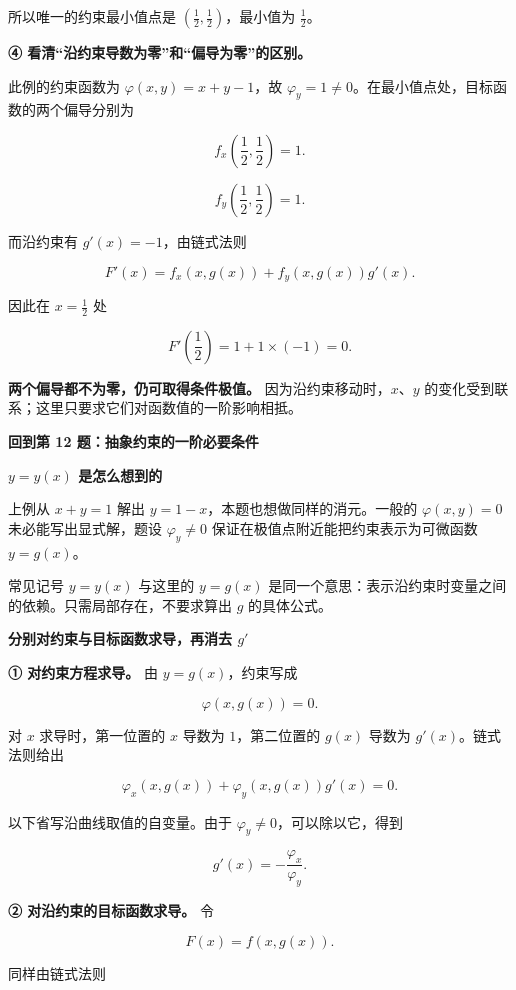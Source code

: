 \documentclass[UTF8,11pt,fontset=windows]{ctexart}
\begin{document}
所以唯一的约束最小值点是 $(\frac12,\frac12)$，最小值为 $\frac12$。

\textbf{④ 看清“沿约束导数为零”和“偏导为零”的区别。}

此例的约束函数为 $\varphi(x,y)=x+y-1$，故 $\varphi_y=1\ne0$。在最小值点处，目标函数的两个偏导分别为

$$
f_x\left(\frac12,\frac12\right)=1.
$$

$$
f_y\left(\frac12,\frac12\right)=1.
$$

而沿约束有 $g'(x)=-1$，由链式法则

$$
F'(x)=f_x(x,g(x))+f_y(x,g(x))g'(x).
$$

因此在 $x=\frac12$ 处

$$
F'\left(\frac12\right)=1+1\times(-1)=0.
$$

\textbf{两个偏导都不为零，仍可取得条件极值。} 因为沿约束移动时，$x$、$y$ 的变化受到联系；这里只要求它们对函数值的一阶影响相抵。

{\bfseries 回到第 12 题：抽象约束的一阶必要条件\par}

{\bfseries $y=y(x)$ 是怎么想到的\par}
上例从 $x+y=1$ 解出 $y=1-x$，本题也想做同样的消元。一般的 $\varphi(x,y)=0$ 未必能写出显式解，题设 $\varphi_y\ne0$ 保证在极值点附近能把约束表示为可微函数 $y=g(x)$。

常见记号 $y=y(x)$ 与这里的 $y=g(x)$ 是同一个意思：表示沿约束时变量之间的依赖。只需局部存在，不要求算出 $g$ 的具体公式。

{\bfseries 分别对约束与目标函数求导，再消去 $g'$\par}
\textbf{① 对约束方程求导。} 由 $y=g(x)$，约束写成

$$
\varphi(x,g(x))=0.
$$

对 $x$ 求导时，第一位置的 $x$ 导数为 $1$，第二位置的 $g(x)$ 导数为 $g'(x)$。链式法则给出

$$
\varphi_x(x,g(x))+\varphi_y(x,g(x))g'(x)=0.
$$

以下省写沿曲线取值的自变量。由于 $\varphi_y\ne0$，可以除以它，得到

$$
g'(x)=-\frac{\varphi_x}{\varphi_y}.
$$

\textbf{② 对沿约束的目标函数求导。} 令

$$
F(x)=f(x,g(x)).
$$

同样由链式法则
\end{document}
